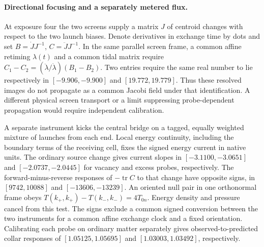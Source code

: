 \documentclass[11pt]{article}
\begin{document}
\paragraph{Directional focusing and a separately metered flux.}
At exposure four the two screens supply a matrix \(J\) of centroid
changes with respect to the two launch biases. Denote derivatives in
exchange time by dots and set \(B=\dot J J^{-1}\),
\(C=\ddot J J^{-1}\). In the same parallel screen frame, a common
affine retiming \(\lambda(t)\) and a common tidal matrix require
\(C_1-C_2=(\ddot\lambda/\dot\lambda)(B_1-B_2)\).
Two entries require the same real number to lie respectively in
\([-9.906,-9.900]\) and \([19.772,19.779]\).
Thus these resolved images do not propagate as a common Jacobi field
under that identification. A different physical screen transport or a
limit suppressing probe-dependent propagation would require independent
calibration.

A separate instrument kicks the central bridge on a tagged, equally
weighted mixture of launches from each end. Local energy continuity,
including the boundary terms of the receiving cell, fixes the signed
energy current in native units. The ordinary source change gives
current slopes in \([-3.1100,-3.0651]\) and \([-2.0737,-2.0445]\)
for vacancy and excess probes, respectively. The forward-minus-reverse
responses of \(-\operatorname{tr} C\) to that change have opposite
signs, in \([9742,10088]\) and \([-13606,-13239]\). An oriented null
pair in one orthonormal frame obeys
\(T(k_+,k_+)-T(k_-,k_-)=4T_{0n}\). Energy density and pressure cancel
from this test. The signs exclude a common signed conversion between
the two instruments for a common affine exchange clock and a fixed
orientation. Calibrating each probe on ordinary matter separately gives
observed-to-predicted collar responses of \([1.05125,1.05695]\)
and \([1.03003,1.03492]\), respectively.
\end{document}
